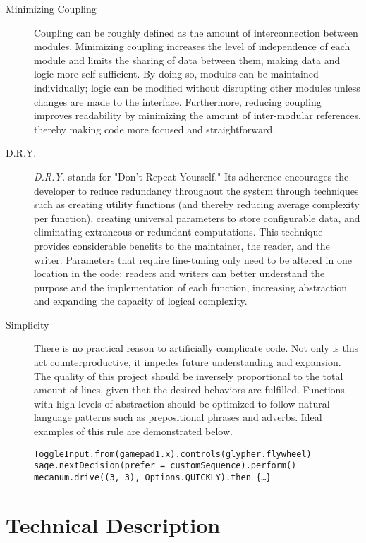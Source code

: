 \documentclass[letterpaper]{article}
\begin{document}
\begin{description}

\item[Minimizing Coupling]
Coupling can be roughly defined as the amount of interconnection between modules. Minimizing coupling increases the level of independence of each module and limits the sharing of data between them, making data and logic more self-sufficient. By doing so, modules can be maintained individually; logic can be modified without disrupting other modules unless changes are made to the interface. Furthermore, reducing coupling improves readability by minimizing the amount of inter-modular references, thereby making code more focused and straightforward.

\item[D.R.Y.]
\textit{D.R.Y.} stands for "Don't Repeat Yourself." Its adherence encourages the developer to reduce redundancy throughout the system through techniques such as creating utility functions (and thereby reducing average complexity per function), creating universal parameters to store configurable data, and eliminating extraneous or redundant computations. This technique provides considerable benefits to the maintainer, the reader, and the writer. Parameters that require fine-tuning only need to be altered in one location in the code; readers and writers can better understand the purpose and the implementation of each function, increasing abstraction and expanding the capacity of logical complexity.

\item[Simplicity]
There is no practical reason to artificially complicate code. Not only is this act counterproductive, it impedes future understanding and expansion. The quality of this project should be inversely proportional to the total amount of lines, given that the desired behaviors are fulfilled. Functions with high levels of abstraction should be optimized to follow natural language patterns such as prepositional phrases and adverbs. Ideal examples of this rule are demonstrated below.
\begin{center}
	\texttt{ToggleInput.from(gamepad1.x).controls(glypher.flywheel)}
	\texttt{sage.nextDecision(prefer = customSequence).perform()}
	\texttt{mecanum.drive((3, 3), Options.QUICKLY).then \{\dots\}}
\end{center}

\end{description}

\section{Technical Description}
\end{document}
